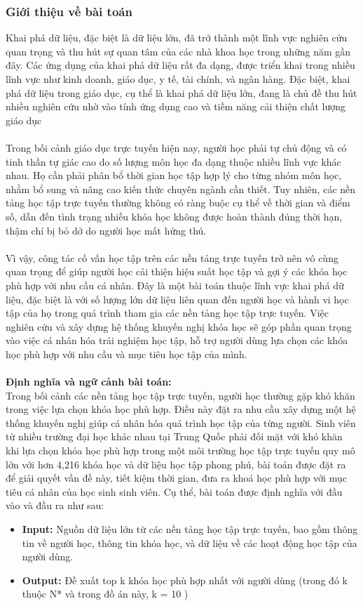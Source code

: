 \subsubsection{Giới thiệu về bài toán}
Khai phá dữ liệu, đặc biệt là dữ liệu lớn, đã trở thành một lĩnh vực nghiên cứu quan trọng và thu hút sự quan tâm của các nhà khoa học trong những năm gần đây. Các ứng dụng của khai phá dữ liệu rất đa dạng, được triển khai trong nhiều lĩnh vực như kinh doanh, giáo dục, y tế, tài chính, và ngân hàng. Đặc biệt, khai phá dữ liệu trong giáo dục, cụ thể là khai phá dữ liệu lớn, đang là chủ đề thu hút nhiều nghiên cứu nhờ vào tính ứng dụng cao và tiềm năng cải thiện chất lượng giáo dục\\
\\
Trong bối cảnh giáo dục trực tuyến hiện nay, người học phải tự chủ động và có tinh thần tự giác cao do số lượng môn học đa dạng thuộc nhiều lĩnh vực khác nhau. Họ cần phải phân bổ thời gian học tập hợp lý cho từng nhóm môn học, nhằm bổ sung và nâng cao kiến thức chuyên ngành cần thiết. Tuy nhiên, các nền tảng học tập trực tuyến thường không có ràng buộc cụ thể về thời gian và điểm số, dẫn đến tình trạng nhiều khóa học không được hoàn thành đúng thời hạn, thậm chí bị bỏ dở do người học mất hứng thú.\\
\\
Vì vậy, công tác cố vấn học tập trên các nền tảng trực tuyến trở nên vô cùng quan trọng để giúp người học cải thiện hiệu suất học tập và gợi ý các khóa học phù hợp với nhu cầu cá nhân. Đây là một bài toán thuộc lĩnh vực khai phá dữ liệu, đặc biệt là với số lượng lớn dữ liệu liên quan đến người học và hành vi học tập của họ trong quá trình tham gia các nền tảng học tập trực tuyến. Việc nghiên cứu và xây dựng hệ thống khuyến nghị khóa học sẽ góp phần quan trọng vào việc cá nhân hóa trải nghiệm học tập, hỗ trợ người dùng lựa chọn các khóa học phù hợp với nhu cầu và mục tiêu học tập của mình.\\
\\
\textbf{Định nghĩa và ngữ cảnh bài toán:}\\
Trong bối cảnh các nền tảng học tập trực tuyến, người học thường gặp khó khăn trong việc lựa chọn khóa học phù hợp. Điều này đặt ra nhu cầu xây dựng một hệ thống khuyến nghị giúp cá nhân hóa quá trình học tập của từng người. Sinh viên từ nhiều trường đại học khác nhau tại Trung Quốc phải đối mặt với khó khăn khi lựa chọn khóa học phù hợp trong một môi trường học tập trực tuyến quy mô lớn với hơn 4,216 khóa học và dữ liệu học tập phong phú, bài toán được đặt ra để giải quyết vấn đề này, tiết kiệm thời gian, đưa ra khoá học phù hợp với mục tiêu cá nhân của học sinh sinh viên. Cụ thể, bài toán được định nghĩa với đầu vào và đầu ra như sau: 
\begin{itemize}
    \item \textbf{Input:} Nguồn dữ liệu lớn từ các nền tảng học tập trực tuyến, bao gồm thông tin về người học, thông tin khóa học, và dữ liệu về các hoạt động học tập của người dùng.
    \item \textbf{Output:} Đề xuất top k khóa học phù hợp nhất với người dùng (trong đó k thuộc N* và trong đồ án này, k = 10 )
\end{itemize}


